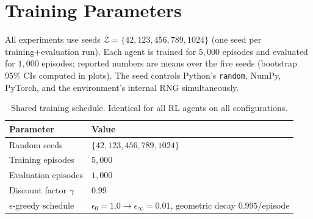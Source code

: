 \documentclass[a4paper,11pt]{article}
\theoremstyle{definition}
\begin{document}
\clearpage
\appendix

\section{Training Parameters}
\label{app:hyperparams}

All experiments use seeds $\mathcal{Z} = \{42, 123, 456, 789, 1024\}$ (one seed per training+evaluation run). Each agent is trained for $5{,}000$ episodes and evaluated for $1{,}000$ episodes; reported numbers are means over the five seeds (bootstrap 95\% CIs computed in plots). The seed controls Python's \texttt{random}, NumPy, PyTorch, and the environment's internal RNG simultaneously.

\begin{table}[H]
\centering
\caption{Shared training schedule. Identical for all RL agents on all configurations.}
\label{tab:shared_hp}
\small
\begin{tabular}{ll}
\toprule
Parameter & Value \\
\midrule
Random seeds                                & $\{42, 123, 456, 789, 1024\}$ \\
Training episodes                           & $5{,}000$ \\
Evaluation episodes                         & $1{,}000$ \\
Discount factor $\gamma$                    & $0.99$ \\
$\epsilon$-greedy schedule                  & $\epsilon_0 = 1.0 \to \epsilon_\infty = 0.01$, geometric decay $0.995$/episode \\
\bottomrule
\end{tabular}
\end{table}
\end{document}
